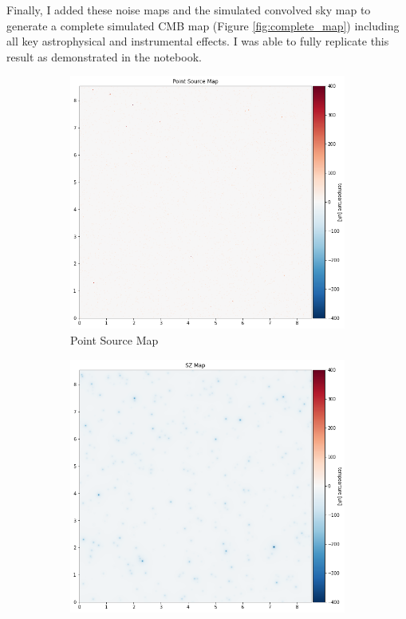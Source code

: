 \documentclass[12pt]{article}
\begin{document}
Finally, I added these noise maps and the simulated convolved sky map to generate a complete simulated CMB map (Figure \ref{fig:complete_map}) including all key astrophysical and instrumental effects. I was able to fully replicate this result as demonstrated in the notebook.

\begin{figure}[h]
    \centering
    \begin{subfigure}[t]{0.3\textwidth}
        \centering
        \includegraphics[width=\textwidth]{images/point source map.png}
        \caption{Point Source Map}
        \label{fig:point_source_map}
    \end{subfigure}
    \hfill
    \begin{subfigure}[t]{0.3\textwidth}
        \centering
        \includegraphics[width=\textwidth]{images/SZ map.png}

\end{subfigure}
\end{figure}
\end{document}
